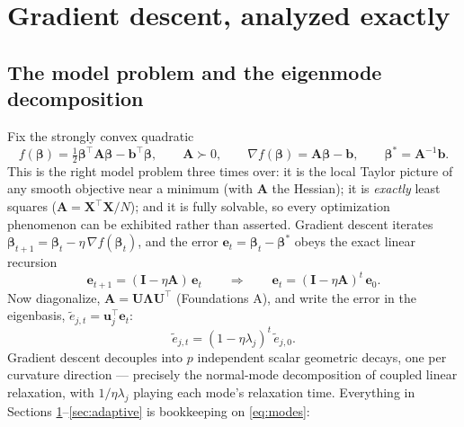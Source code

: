 \documentclass[11pt]{article}
\numberwithin{equation}{section}
\theoremstyle{plain}
\theoremstyle{definition}
\theoremstyle{remark}
\newcommand{\X}{\bm{X}}
\newcommand{\bbeta}{\bm{\beta}}
\newcommand{\T}{\top}
\begin{document}
\section{Gradient descent, analyzed exactly}\label{sec:gd}

\subsection{The model problem and the eigenmode decomposition}

Fix the strongly convex quadratic
\begin{equation}
f(\bbeta) = \tfrac12 \bbeta^\T \bm{A} \bbeta - \bm{b}^\T \bbeta,
\qquad \bm{A} \succ 0,
\qquad \nabla f(\bbeta) = \bm{A}\bbeta - \bm{b},
\qquad \bbeta^\ast = \bm{A}^{-1}\bm{b}.
\label{eq:quadprob}
\end{equation}
This is the right model problem three times over: it is the local Taylor picture of any smooth objective near a minimum (with $\bm A$ the Hessian); it is \emph{exactly} least squares ($\bm A = \X^\T\X/N$); and it is fully solvable, so every optimization phenomenon can be exhibited rather than asserted. Gradient descent iterates $\bbeta_{t+1} = \bbeta_t - \eta\, \nabla f(\bbeta_t)$, and the error $\bm{e}_t = \bbeta_t - \bbeta^\ast$ obeys the exact linear recursion
\begin{equation}
\bm{e}_{t+1} = (\bm{I} - \eta \bm{A})\, \bm{e}_t
\qquad\Longrightarrow\qquad
\bm{e}_t = (\bm{I} - \eta \bm{A})^t\, \bm{e}_0 .
\label{eq:gditer}
\end{equation}
Now diagonalize, $\bm{A} = \bm{U}\bm{\Lambda}\bm{U}^\T$ (Foundations A), and write the error in the eigenbasis, $\tilde{e}_{j,t} = \bm{u}_j^\T \bm{e}_t$:
\begin{equation}
\tilde e_{j,t} = (1 - \eta \lambda_j)^t\, \tilde e_{j,0} .
\label{eq:modes}
\end{equation}
Gradient descent decouples into $p$ independent scalar geometric decays, one per curvature direction --- precisely the normal-mode decomposition of coupled linear relaxation, with $1/\eta\lambda_j$ playing each mode's relaxation time. Everything in Sections \ref{sec:gd}--\ref{sec:adaptive} is bookkeeping on \eqref{eq:modes}:
\end{document}
